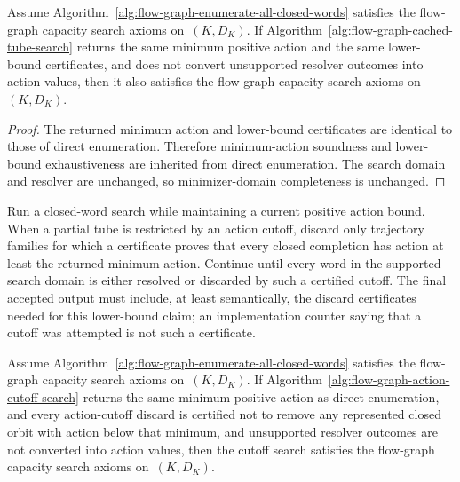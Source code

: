 \begin{unverified}
\begin{proposition}%
\label{prop:cached-tube-search-satisfies-axioms}
Assume Algorithm~\ref{alg:flow-graph-enumerate-all-closed-words} satisfies the
flow-graph capacity search axioms on~$(K,D_K)$.  If
Algorithm~\ref{alg:flow-graph-cached-tube-search} returns the same minimum
positive action and the same lower-bound certificates, and does not convert
unsupported resolver outcomes into action values, then it also satisfies the
flow-graph capacity search axioms on~$(K,D_K)$.
\end{proposition}

\begin{proof}
The returned minimum action and lower-bound certificates are identical to those
of direct enumeration.  Therefore minimum-action soundness and lower-bound
exhaustiveness are inherited from direct enumeration.  The search domain and
resolver are unchanged, so minimizer-domain completeness is unchanged.
\end{proof}
\end{unverified}

\begin{unverified}
\begin{algorithm}\label{alg:flow-graph-action-cutoff-search}
Run a closed-word search while maintaining a current positive action bound.
When a partial tube is restricted by an action cutoff, discard only trajectory
families for which a certificate proves that every closed completion has action
at least the returned minimum action.  Continue until every word in the
supported search domain is either resolved or discarded by such a certified
cutoff.  The final accepted output must include, at least semantically, the
discard certificates needed for this lower-bound claim; an implementation
counter saying that a cutoff was attempted is not such a certificate.
\end{algorithm}
\end{unverified}

\begin{unverified}
\begin{proposition}%
\label{prop:action-cutoff-search-satisfies-axioms}
Assume Algorithm~\ref{alg:flow-graph-enumerate-all-closed-words} satisfies the
flow-graph capacity search axioms on~$(K,D_K)$.  If
Algorithm~\ref{alg:flow-graph-action-cutoff-search} returns the same minimum
positive action as direct enumeration, and every action-cutoff discard is
certified not to remove any represented closed orbit with action below that
minimum, and unsupported resolver outcomes are not converted into action
values, then the cutoff search satisfies the flow-graph capacity search axioms
on~$(K,D_K)$.
\end{proposition}
\end{unverified}

